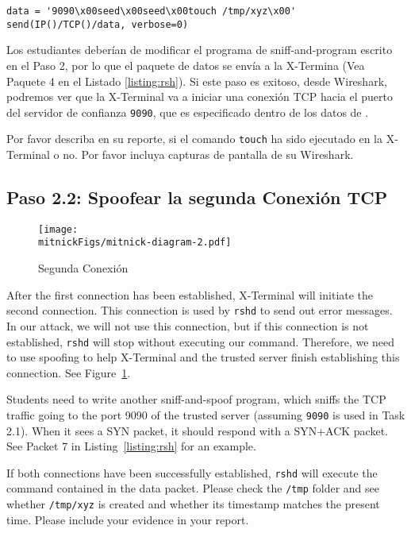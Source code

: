 \begin{lstlisting}
data = '9090\x00seed\x00seed\x00touch /tmp/xyz\x00'
send(IP()/TCP()/data, verbose=0)
\end{lstlisting}
 
Los estudiantes deberían de modificar el programa de sniff-and-program escrito en el Paso 2, por lo que el paquete de datos \rsh se envía a la X-Termina (Vea Paquete 4 en el Listado \ref{listing:rsh}). 
Si este paso es exitoso, desde Wireshark, podremos ver que la X-Terminal va a iniciar una conexión TCP hacia el puerto del servidor de confianza \texttt{9090}, que es especificado dentro de los datos de \rsh.

Por favor describa en su reporte, si el comando \texttt{touch} ha sido ejecutado en la X-Terminal o no. Por favor incluya capturas de pantalla de su Wireshark.


\subsection{Paso 2.2: Spoofear la segunda Conexión TCP}
\label{sec:second-conn}

\begin{figure}[htb]
\centering
\texttt{[image: \\mitnickFigs/mitnick-diagram-2.pdf]}
\caption{Segunda Conexión}
\label{fig:second-conn}
\end{figure}


After the first connection has been established, X-Terminal will initiate 
the second connection. This connection is used by \texttt{rshd} to send 
out error messages. In our attack, we will not use this connection, but
if this connection is not established, \texttt{rshd} will stop without 
executing our command. Therefore, we need to use spoofing 
to help X-Terminal and the trusted server finish establishing this connection. 
See Figure~\ref{fig:second-conn}. 


Students need to write another sniff-and-spoof program, which
sniffs the TCP traffic going to the port 9090 of the trusted server (assuming
\texttt{9090} is used in Task 2.1). When it sees a SYN packet,
it should respond with a SYN+ACK packet. See Packet 7 
in Listing~\ref{listing:rsh} for an example.

If both connections have been successfully established, \texttt{rshd} 
will execute the command contained in the \rsh data packet. Please 
check the \texttt{/tmp} folder and see whether \texttt{/tmp/xyz} is created
and whether its timestamp matches the present time. Please 
include your evidence in your report. 



